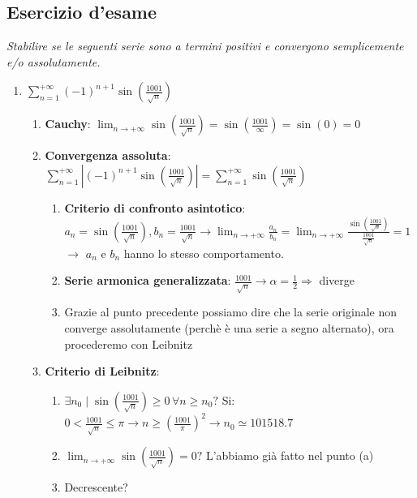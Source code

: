 \documentclass[10pt, a4paper]{article}
\begin{document}
    \subsection{Esercizio d'esame}
        \textit{Stabilire se le seguenti serie sono a termini positivi e convergono semplicemente e/o assolutamente.}
        \begin{enumerate}
            \item $\sum_{n=1}^{+\infty}(-1)^{n+1}\sin\left(\frac{1001}{\sqrt{n}}\right)$ \begin{enumerate}
                \item \textbf{Cauchy}: $\lim_{n\rightarrow+\infty}\sin\left(\frac{1001}{\sqrt{n}}\right)=\sin\left(\frac{1001}{\infty}\right)=\sin(0)=0$
                \item \textbf{Convergenza assoluta}: $\sum_{n=1}^{+\infty}\left|(-1)^{n+1}\sin\left(\frac{1001}{\sqrt{n}}\right)\right|=\sum_{n=1}^{+\infty}\sin\left(\frac{1001}{\sqrt{n}}\right)$ \begin{enumerate}
                    \item \textbf{Criterio di confronto asintotico}: \scriptsize$a_n = \sin\left(\frac{1001}{\sqrt{n}}\right), b_n = \frac{1001}{\sqrt{n}} \rightarrow \lim_{n\rightarrow+\infty}\frac{a_n}{b_n}=\lim_{n\rightarrow+\infty}\frac{\sin\left(\frac{1001}{\sqrt{n}}\right)}{\frac{1001}{\sqrt{n}}}=1$\normalsize \\ $\rightarrow$ $a_n$ e $b_n$ hanno lo stesso comportamento.
                    \item \textbf{Serie armonica generalizzata}: $\frac{1001}{\sqrt{n}}\rightarrow\alpha=\frac{1}{2}\Rightarrow$ diverge
                    \item Grazie al punto precedente possiamo dire che la serie originale non converge assolutamente (perchè è una serie a segno alternato), ora procederemo con Leibnitz
                \end{enumerate}
                \item \textbf{Criterio di Leibnitz}: \begin{enumerate}
                    \item $\exists n_0\mid \sin\left(\frac{1001}{\sqrt{n}}\right)\geq 0\,\forall n\geq n_0?$ Si: $0<\frac{1001}{\sqrt{n}}\leq\pi\rightarrow n\geq\left(\frac{1001}{\pi}\right)^2\rightarrow n_0\simeq 101518.7$
                    \item $\lim_{n\rightarrow+\infty}\sin\left(\frac{1001}{\sqrt{n}}\right)=0?$ L'abbiamo già fatto nel punto (a)
                    \item Decrescente? \begin{enumerate}

\end{enumerate}
\end{enumerate}
\end{enumerate}
\end{enumerate}
\end{document}
